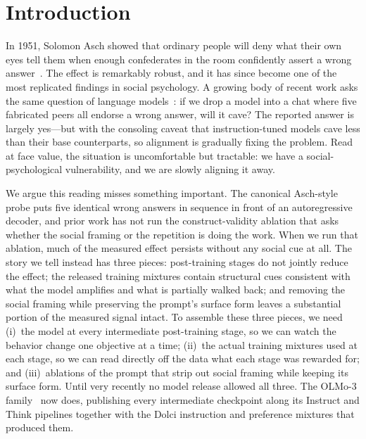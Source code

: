 \documentclass{article}
\begin{document}
\section{Introduction}
\label{sec:intro}

In 1951, Solomon Asch showed that ordinary people will deny what their own eyes tell them when enough confederates in the room confidently assert a wrong answer~\citep{asch1956}. The effect is remarkably robust, and it has since become one of the most replicated findings in social psychology. A growing body of recent work asks the same question of language models~\citep{zhu2025conformity, weng2025benchform, shoval2025psychiatric}: if we drop a model into a chat where five fabricated peers all endorse a wrong answer, will it cave? The reported answer is largely yes---but with the consoling caveat that instruction-tuned models cave less than their base counterparts, so alignment is gradually fixing the problem. Read at face value, the situation is uncomfortable but tractable: we have a social-psychological vulnerability, and we are slowly aligning it away.

We argue this reading misses something important. The canonical Asch-style probe puts five identical wrong answers in sequence in front of an autoregressive decoder, and prior work has not run the construct-validity ablation that asks whether the social framing or the repetition is doing the work. When we run that ablation, much of the measured effect persists without any social cue at all. The story we tell instead has three pieces: post-training stages do not jointly reduce the effect; the released training mixtures contain structural cues consistent with what the model amplifies and what is partially walked back; and removing the social framing while preserving the prompt's surface form leaves a substantial portion of the measured signal intact. To assemble these three pieces, we need (i)~the model at every intermediate post-training stage, so we can watch the behavior change one objective at a time; (ii)~the actual training mixtures used at each stage, so we can read directly off the data what each stage was rewarded for; and (iii)~ablations of the prompt that strip out social framing while keeping its surface form. Until very recently no model release allowed all three. The OLMo-3 family~\citep{olmo3} now does, publishing every intermediate checkpoint along its Instruct and Think pipelines together with the Dolci instruction and preference mixtures that produced them.
\end{document}
